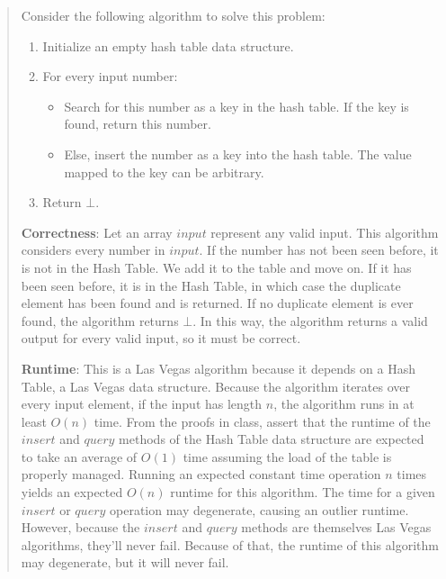 \documentclass[11pt]{article}
\begin{document}
\begin{enumerate}
\begin{quote}
        Consider the following algorithm to solve this problem:
        \begin{enumerate}
            \item Initialize an empty hash table data structure.
            \item For every input number:
            \begin{itemize}
                \item Search for this number as a key in the hash table. If the key is found, return this number.
                \item Else, insert the number as a key into the hash table. The value mapped to the key can be arbitrary.
            \end{itemize}
            \item Return $\bot$.
        \end{enumerate}

        \vspace{1em}
        \textbf{Correctness}: \newline
        Let an array $input$ represent any valid input. This algorithm considers every number in $input$. If the number has not been seen before, it is not in the Hash Table. We add it to the table and move on. If it has been seen before, it is in the Hash Table, in which case the duplicate element has been found and is returned. If no duplicate element is ever found, the algorithm returns $\bot$. In this way, the algorithm returns a valid output for every valid input, so it must be correct.
        
        \vspace{1em}
        \textbf{Runtime}: \newline
        This is a Las Vegas algorithm because it depends on a Hash Table, a Las Vegas data structure. Because the algorithm iterates over every input element, if the input has length $n$, the algorithm runs in at least $O(n)$ time. From the proofs in class, assert that the runtime of the $insert$ and $query$ methods of the Hash Table data structure are expected to take an average of $O(1)$ time assuming the load of the table is properly managed. Running an expected constant time operation $n$ times yields an expected $O(n)$ runtime for this algorithm. The time for a given $insert$ or $query$ operation may degenerate, causing an outlier runtime. However, because the $insert$ and $query$ methods are themselves Las Vegas algorithms, they'll never fail. Because of that, the runtime of this algorithm may degenerate, but it will never fail.


\end{quote}
\end{enumerate}
\end{document}
